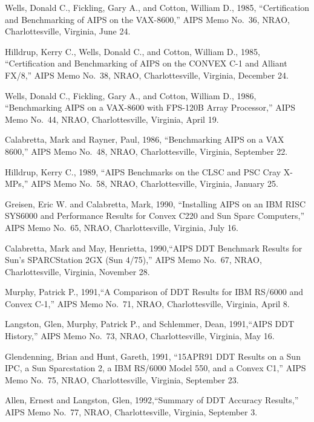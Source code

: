 \begin{thebibliography}{9}


 Wells, Donald C., Fickling, Gary A., and Cotton,
   William D., 1985, ``Certification and Benchmarking of AIPS on the
   VAX-8600,'' AIPS Memo No.~36, NRAO, Charlottesville, Virginia,
   June 24.

 Hilldrup, Kerry C., Wells, Donald C., and Cotton,
   William D., 1985, ``Certification and Benchmarking of AIPS on the
   CONVEX C-1 and Alliant FX/8,'' AIPS Memo No.~38, NRAO,
   Charlottesville, Virginia, December 24.

 Wells, Donald C., Fickling, Gary A., and Cotton,
  William D., 1986, ``Benchmarking AIPS on a VAX-8600 with FPS-120B
   Array Processor,'' AIPS Memo No.~44, NRAO, Charlottesville,
   Virginia, April 19.

 Calabretta, Mark and Rayner, Paul, 1986,
   ``Benchmarking AIPS on a VAX 8600,'' AIPS Memo No.~48, NRAO,
   Charlottesville, Virginia, September 22.

 Hilldrup, Kerry C., 1989, ``AIPS Benchmarks on the
   CLSC and PSC Cray X-MPs,'' AIPS Memo No.~58, NRAO, Charlottesville,
   Virginia, January 25.

 Greisen, Eric W. and Calabretta, Mark, 1990,
   ``Installing AIPS on an IBM RISC SYS6000 and Performance Results
   for Convex C220 and Sun Sparc Computers,'' AIPS Memo No.~65, NRAO,
   Charlottesville, Virginia, July 16.

 Calabretta, Mark and May, Henrietta, 1990,``AIPS DDT
   Benchmark Results for Sun's SPARCStation 2GX (Sun 4/75),'' AIPS
   Memo No.~67, NRAO, Charlottesville, Virginia, November 28.

 Murphy, Patrick P., 1991,``A Comparison of DDT
   Results for IBM RS/6000 and Convex C-1,'' AIPS Memo No.~71, NRAO,
   Charlottesville, Virginia, April 8.

 Langston, Glen, Murphy, Patrick P., and Schlemmer,
   Dean, 1991,``AIPS DDT History,'' AIPS Memo No.~73, NRAO,
   Charlottesville, Virginia, May 16.

 Glendenning, Brian and Hunt, Gareth, 1991, ``15APR91
   DDT Results on a Sun IPC, a Sun Sparcstation 2, a IBM RS/6000 Model
   550, and a Convex C1,'' AIPS Memo No.~75, NRAO, Charlottesville,
   Virginia, September 23.

 Allen, Ernest and Langston, Glen, 1992,``Summary of
   DDT Accuracy Results,'' AIPS Memo No.~77, NRAO, Charlottesville,
   Virginia, September 3.

\end{thebibliography}


